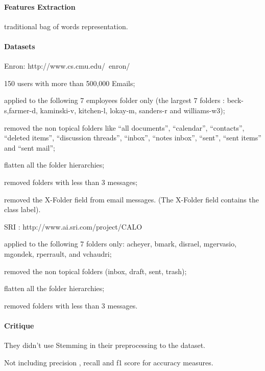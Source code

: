 \documentclass[12pt]{article}
\newenvironment{my_itemize}
{\begin{itemize}
  \setlength{\itemsep}{0cm}
  \setlength{\parskip}{0cm}}
{\end{itemize}}
\begin{document}
\paragraph{Features Extraction}
traditional bag of words representation.

\paragraph{Datasets}
    \begin{my_itemize}
    \item Enron: http://www.cs.cmu.edu/~enron/
    \begin{my_itemize}
        \item 150 users with more than 500,000 Emails;
        \item applied to the following 7 employees folder only 
	      (the largest 7 folders : beck-s,farmer-d, kaminski-v, 
	      kitchen-l, lokay-m, sanders-r and williams-w3);
        \item removed the non topical folders like ``all documents'', 
	      ``calendar'', ``contacts'', ``deleted items'', ``discussion threads'', 
	      ``inbox'', ``notes inbox'', ``sent'', ``sent items'' and ``sent mail'';
        \item flatten all the folder hierarchies;
        \item removed folders with less than 3 messages;
        \item removed the X-Folder field from email messages. (The X-Folder 
	      field contains the class label).
    \end{my_itemize}
    \item SRI : http://www.ai.sri.com/project/CALO
    \begin{my_itemize}
        \item applied to the following 7 folders only: acheyer, bmark, disrael, 
	      mgervasio, mgondek, rperrault, and vchaudri;
        \item removed the non topical folders (inbox, draft, sent, trash);
        \item flatten all the folder hierarchies;
        \item removed folders with less than 3 messages.
    \end{my_itemize}
\end{my_itemize}

\paragraph{Critique}
\begin{my_itemize}
    \item They didn’t use Stemming in their preprocessing to the dataset.
    \item Not including precision , recall and f1 score for accuracy measures.
\end{my_itemize}
\end{document}
